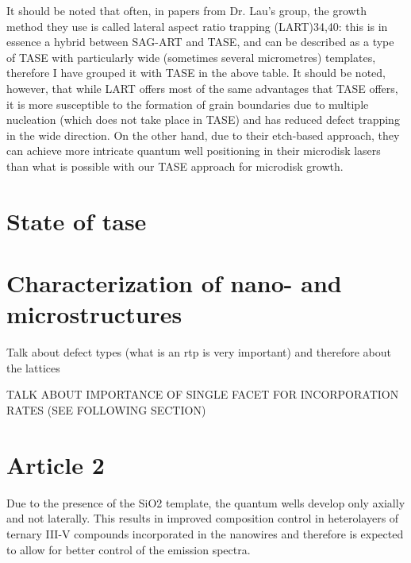 It should be noted that often, in papers from Dr. Lau’s group, the growth method they use is called lateral aspect ratio trapping (LART)34,40: this is in essence a hybrid between SAG-ART and TASE, and can be described as a type of TASE with particularly wide (sometimes several micrometres) templates, therefore I have grouped it with TASE in the above table. It should be noted, however, that while LART offers most of the same advantages that TASE offers, it is more susceptible to the formation of grain boundaries due to multiple nucleation (which does not take place in TASE) and has reduced defect trapping in the wide direction. On the other hand, due to their etch-based approach, they can achieve more intricate quantum well positioning in their microdisk lasers than what is possible with our TASE approach for microdisk growth.

\section{\texorpdfstring{State of \acl{tase}}{State of template assisted selective epitaxy}}
\section{Characterization of nano- and microstructures}
Talk about defect types (what is an rtp is very important) and therefore about the lattices

TALK ABOUT IMPORTANCE OF SINGLE FACET FOR INCORPORATION RATES (SEE FOLLOWING SECTION)

\section{Article 2}

Due to the presence of the SiO2 template, the quantum wells
develop only axially and not laterally. This results in improved
composition control in heterolayers of ternary III-V
compounds incorporated in the nanowires\cite{Borg2019} and therefore is
expected to allow for better control of the emission spectra.